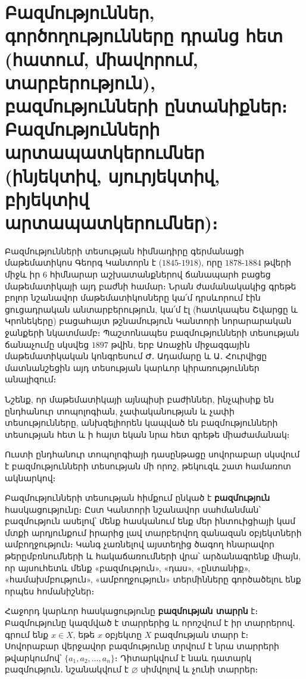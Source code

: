 \documentclass[./main.tex]{subfiles}
\begin{document}
\onehalfspacing

\section{Բազմություններ, գործողությունները դրանց հետ (հա\-տում, միա\-վո\-րում, տար\-բե\-րու\-թյուն), բազ\-մու\-թյուն\-նե\-րի ըն\-տա\-նիք\-ներ։ Բազ\-մու\-թյուն\-նե\-րի ար\-տա\-պատ\-կե\-րում\-ներ (ին\-յե\-կտիվ, սյուր\-յեկ\-տիվ, բի\-յեկ\-տիվ արտա\-պատ\-կե\-րում\-ներ)։}\label{sec:1}

Բազմությունների տեսության հիմնադիրը գերմանացի մաթեմատիկոս Գեորգ Կանտորն է ($1845$-$1918$), որը $1878$-$1884$ թվերի միջև իր $6$ հիմնարար աշխատանք\-նե\-րով ճանա\-պարհ բացեց մաթեմատիկայի այդ բաժնի համար։ Նրան ժամանակակից գրեթե բոլոր նշանավոր մաթեմատիկոսները կա՛մ դրսևորում էին ցուցադրական անտար\-բերութ\-յուն, կա՛մ էլ (հատկապես Շվարցը և Կրոնեկերը) բացահայտ թշնա\-մու\-թյուն Կանտորի նորարարական ջանքերի նկատմամբ։ Պաշտոնապես բազմու\-թյունների տեսության ճանաչումը սկսվեց $1897$ թվին, երբ Առաջին միջազգային մաթե\-մա\-տի\-կա\-կան կոնգ\-րեսում Ժ․ Ադամարը և Ա․ Հուրվիցը մատնանշեցին այդ տեսության կարևոր կիրա\-ռութ\-յուններ անալիզում։
\par Նշենք, որ մաթեմատիկայի այնպիսի բաժիններ, ինչպիսիք են ընդհանուր տոպո\-լո\-գիան, չափականության և չափի տեսությունները, անխզելիորեն կապված են բազ\-մութ\-յունների տեսության հետ և ի հայտ եկան նրա հետ գրեթե միաժամանակ։
\par Ուստի ընդհանուր տոպոլոգիայի դասընթացը սովորաբար սկսվում է բազմութ\-յուն\-ների տեսության մի որոշ, թեկուզև շատ համառոտ ակնարկով։

\par Բազմությունների տեսության հիմքում ընկած է \textbf{բազմություն} հասկացությունը։ Ըստ Կանտորի նշանավոր սահմանման՝ բազմություն ասելով՝ մենք հասկանում ենք մեր ին\-տուի\-ցի\-ա\-յի կամ մտքի արդյունքում իրարից լավ տարբերվող զանազան օբյեկտների
ամ\-բողջութ\-յուն։ Կանգ չառնելով այստեղից ծագող հնարավոր թեր\-ըմբռնում\-ների և հա\-կա\-ճառում\-նե\-րի վրա՝ արձանագրենք միայն, որ այսուհետև մենք «բազմություն», «դաս», «ընտանիք», «համախմբություն», «ամբողջություն» տեր\-մին\-ները գործածելու ենք որպես հոմանիշներ։
\par Հաջորդ կարևոր հասկացությունը \textbf{բազմության տարրն} է։ Բազմությունը կազմ\-ված է տարրերից և որոշվում է իր տարրերով․ գրում ենք $x \in X$, եթե $x$ օբյեկտը $X$ բազմության տարր է։ Սովորաբար վերջավոր բազմությունը տրվում է նրա տարրերի թվարկումով՝ $\{a_1, a_2, \dots, a_n\}$։ Դիտարկվում է նաև դատարկ բազմություն․ նշա\-նակ\-վում է $\varnothing$ սիմվոլով և չունի տարրեր։
\end{document}
